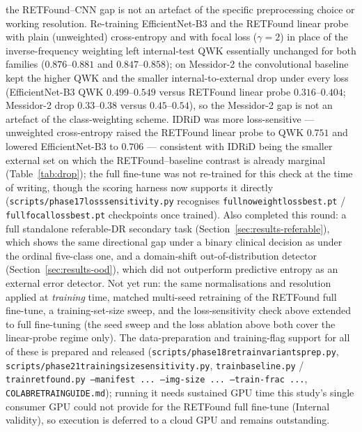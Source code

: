 \documentclass[journal]{IEEEtran}
\renewcommand{\_}{\origunderscore\allowbreak}
\begin{document}
the RETFound--CNN gap is not an artefact of the specific preprocessing choice or
working resolution. Re-training EfficientNet-B3 and the RETFound linear probe
with plain (unweighted) cross-entropy and with focal loss ($\gamma=2$) in place
of the inverse-frequency weighting left internal-test QWK essentially unchanged
for both families ($0.876$--$0.881$ and $0.847$--$0.858$); on Messidor-2 the
convolutional baseline kept the higher QWK and the smaller internal-to-external
drop under every loss (EfficientNet-B3 QWK $0.499$--$0.549$ versus RETFound
linear probe $0.316$--$0.404$; Messidor-2 drop $0.33$--$0.38$ versus
$0.45$--$0.54$), so the Messidor-2 gap is not an artefact of the class-weighting
scheme. IDRiD was more loss-sensitive --- unweighted cross-entropy raised the
RETFound linear probe to QWK $0.751$ and lowered EfficientNet-B3 to $0.706$ ---
consistent with IDRiD being the smaller external set on which the
RETFound--baseline contrast is already marginal (Table~\ref{tab:drop});
the full fine-tune was not re-trained for this check at the time of writing,
though the scoring harness now supports it directly
(\texttt{scripts/\allowbreak{}phase17\_loss\_sensitivity.py} recognises
\texttt{full\_noweight\_loss\_best.pt} / \texttt{full\_focal\_loss\_best.pt}
checkpoints once trained). Also completed this round: a full standalone
referable-DR secondary task (Section~\ref{sec:results-referable}), which shows
the same directional gap under a binary clinical decision as under the ordinal
five-class one, and a domain-shift out-of-distribution detector
(Section~\ref{sec:results-ood}), which did not outperform predictive entropy as
an external error detector. Not yet run: the same normalisations and resolution
applied at \emph{training} time, matched multi-seed retraining of the RETFound
full fine-tune, a training-set-size sweep, and the loss-sensitivity check above
extended to full fine-tuning (the seed sweep and the loss ablation above both
cover the linear-probe regime only). The data-preparation and training-flag
support for all of these is prepared and released
(\texttt{scripts/\allowbreak{}phase18\_retrain\_variants\_prep.py},
\texttt{scripts/\allowbreak{}phase21\_training\_size\_sensitivity.py},
\texttt{train\_baseline.py} / \texttt{train\_retfound.py --manifest ...
--img-size ... --train-frac ...}, \texttt{COLAB\_RETRAIN\_GUIDE.md}); running it
needs sustained GPU time this study's single consumer GPU could not provide for
the RETFound full fine-tune (Internal validity), so execution is deferred to a
cloud GPU and remains outstanding.
\end{document}
